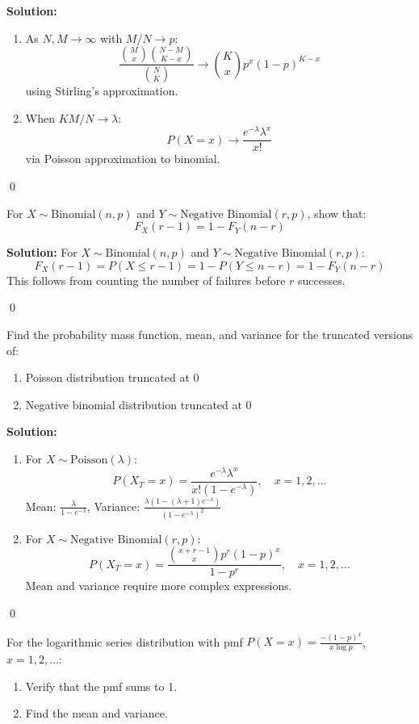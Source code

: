 \noindent\textbf{Solution:}
\begin{enumerate}[label=(\alph*)]
\item As \( N,M \to \infty \) with \( M/N \to p \):
\[
\frac{\binom{M}{x}\binom{N-M}{K-x}}{\binom{N}{K}} \to \binom{K}{x}p^x(1-p)^{K-x}
\]
using Stirling's approximation.

\item When \( KM/N \to \lambda \):
\[
P(X=x) \to \frac{e^{-\lambda}\lambda^x}{x!}
\]
via Poisson approximation to binomial.
\end{enumerate}


\qed
\begin{problembox}
For \( X \sim \text{Binomial}(n,p) \) and \( Y \sim \text{Negative Binomial}(r,p) \), show that:
\[
F_X(r-1) = 1 - F_Y(n-r)
\]
\end{problembox}

\noindent\textbf{Solution:}
For \( X \sim \text{Binomial}(n,p) \) and \( Y \sim \text{Negative Binomial}(r,p) \):
\[
F_X(r-1) = P(X \leq r-1) = 1 - P(Y \leq n-r) = 1 - F_Y(n-r)
\]
This follows from counting the number of failures before \( r \) successes.


\qed
\begin{problembox}
Find the probability mass function, mean, and variance for the truncated versions of:
\begin{enumerate}[label=(\alph*)]
\item Poisson distribution truncated at 0
\item Negative binomial distribution truncated at 0
\end{enumerate}
\end{problembox}

\noindent\textbf{Solution:}
\begin{enumerate}[label=(\alph*)]
\item For \( X \sim \text{Poisson}(\lambda) \):
\[
P(X_T=x) = \frac{e^{-\lambda}\lambda^x}{x!(1-e^{-\lambda})}, \quad x=1,2,\ldots
\]
Mean: \( \frac{\lambda}{1-e^{-\lambda}} \), Variance: \( \frac{\lambda(1-(\lambda+1)e^{-\lambda})}{(1-e^{-\lambda})^2} \)

\item For \( X \sim \text{Negative Binomial}(r,p) \):
\[
P(X_T=x) = \frac{\binom{x+r-1}{x}p^r(1-p)^x}{1-p^r}, \quad x=1,2,\ldots
\]
Mean and variance require more complex expressions.
\end{enumerate}


\qed
\begin{problembox}
For the logarithmic series distribution with pmf \( P(X=x) = \frac{-(1-p)^x}{x\log p} \), \( x=1,2,\ldots \):
\begin{enumerate}[label=(\alph*)]
\item Verify that the pmf sums to 1.
\item Find the mean and variance.
\end{enumerate}
\end{problembox}

